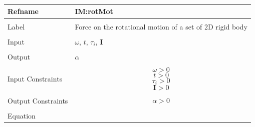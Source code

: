 \documentclass[12pt]{article}
\begin{document}
 \noindent \begin{minipage}{\textwidth}
\begin{tabular}{p{} p{}}
\toprule \textbf{Refname} & \textbf{IM:rotMot}
\label{IM:rotMot}
\\ \midrule \\
Label & Force on the rotational motion of a set of 2D rigid body
        \\ \midrule \\
        Input & $ω$, $t$, ${τ_{i}}$, $\mathbf{I}$
                \\ \midrule \\
                Output & $α$
                         \\ \midrule \\
                         Input Constraints & \begin{displaymath}
                                             ω>0
                                             \end{displaymath}
                                             \begin{displaymath}
                                             t>0
                                             \end{displaymath}
                                             \begin{displaymath}
                                             {τ_{i}}>0
                                             \end{displaymath}
                                             \begin{displaymath}
                                             \mathbf{I}>0
                                             \end{displaymath}
                                             \\ \midrule \\
                                             Output Constraints & \begin{displaymath}
                                                                  α>0
                                                                  \end{displaymath}
                                                                  \\ \midrule \\
                                                                  Equation & \begin{displaymath}

\end{displaymath}
\end{tabular}
\end{minipage}
\end{document}
